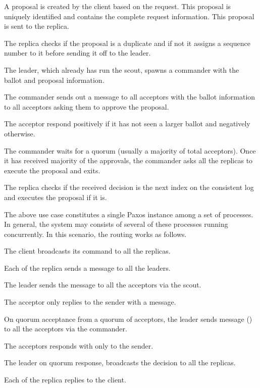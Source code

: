 \begin{enum}
    \item A proposal is created by the client based on the request. This
      proposal is uniquely identified and contains the complete request
      information. This proposal is sent to the replica.
    \item The replica checks if the proposal is a duplicate and if not it
      assigns a sequence number%
      to it before sending it off to the leader.
    \item The leader, which already has run the scout, spawns a commander with
      the ballot and proposal information.
    \item The commander sends out a message to all acceptors with the ballot
      information to all acceptors asking them to approve the proposal.
    \item The acceptor respond positively if it has not seen a larger
      ballot and negatively otherwise.
    \item The commander waits for a quorum (usually a majority of total
      acceptors). Once it has received majority of the approvals,
      the commander asks all the replicas to execute the proposal and exits.
    \item The replica checks if the received decision is the next index on
      the consistent log and executes the proposal if it is.
\end{enum}

The above use case constitutes a single Paxos instance among a set of processes.
In general, the system may consists of several of these processes running
concurrently. In this scenario, the routing works as follows.

\begin{enum}
  \item The client broadcasts its command to all the replicas.
  \item Each of the replica sends a  message to all the leaders.
  \item The leader sends the  message to all the acceptors via the 
    scout.
  \item The acceptor only replies to the sender with a  message.
  \item On quorum acceptance from a quorum of acceptors, the leader sends
     message () to all the acceptors via the commander.
  \item The acceptors responds with  only to the sender.
  \item The leader on quorum response, broadcasts the decision to all the
    replicas.
  \item Each of the replica replies to the client.
\end{enum}


